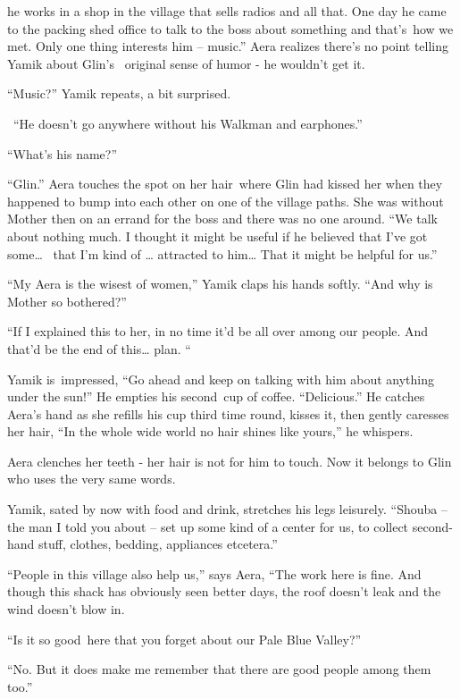 \documentclass[letterpaper]{article}
\begin{document}
he works in a shop in the village that sells radios and all that. One day he came to the packing shed office to talk to
the boss about something and that's~how we met. Only one thing interests him -- music.'' Aera realizes there's no point
telling Yamik about Glin's \textcolor{red}{\ }original\textcolor{red}{ }sense of humor - he wouldn't get it. 

{}``Music?'' Yamik repeats, a bit surprised.

~``He doesn't go anywhere without his Walkman and earphones.'' 

{}``What's his name?'' 

{}``Glin.'' Aera touches the spot on her hair~where Glin had kissed her when they happened to bump into each other on
one of the village paths. She was without Mother then on an errand for the boss and there was no one around. ``We talk
about nothing much. I thought it might be useful if he believed that I've got some{\dots} \ that I'm kind of {\dots}
attracted to him{\dots} That it might be helpful for us.'' 

{}``My Aera is the wisest of women,'' Yamik claps his hands softly. ``And why is Mother so bothered?'' 

{}``If I explained this to her, in no time it'd be all over among our people. And that'd be the end of this{\dots} plan.
``

Yamik is~impressed, ``Go ahead and keep on talking with him about anything under the sun!'' He empties his second~cup of
coffee. ``Delicious.'' He catches Aera's hand as she refills his cup third time round, kisses it, then gently caresses
her hair, ``In the whole wide world no hair shines like yours,'' he whispers.

Aera clenches her teeth - her hair is not for him to touch. Now it belongs to Glin who uses the very same words.~ 

Yamik, sated by now with food and drink, stretches his legs leisurely. ``Shouba -- the man I told you about -- set up
some kind of a center for us, to collect second-hand stuff, clothes, bedding, appliances etcetera.'' 

{}``People in this village also help us,'' says Aera, ``The work here is fine. And though this shack has obviously seen
better days, the roof doesn't leak and the wind doesn't blow in.{\textquotedbl}

{}``Is it so good~here that you forget about our Pale Blue Valley?'' 

{}``No. But it does make me remember that there are good people among them too.'' 
\end{document}

